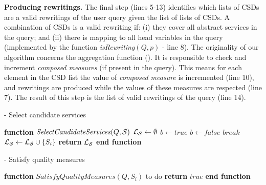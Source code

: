 \noindent \textbf{Producing rewritings.} The final step (lines 5-13) identifies which lists of CSDs are a valid
rewritings of the user query given the list of lists of CSDs.
A combination of CSDs is a valid rewriting if: (i) they cover all abstract services in the query; and 
(ii) there is mapping to all head variables in the query (implemented by the function \textit{isRewriting}$(Q, p)$ - line 8).
The originality of our algorithm concerns the aggregation function ().
It is responsible to check and increment \textit{composed measures} (if present in the query). 
This means for each element in the CSD list the value of \textit{composed measure} is incremented (line 10), and rewritings are produced while the values of these measures are respected (line 7). 
The result of this step is the list of valid 
 rewritings of the query (line 14).%
 
\begin{algorithm}
\caption{ - Select candidate services}
\label{selectingservices}
\begin{algorithmic}[1]
\STATE \textbf{function} $\mathit{SelectCandidateServices} (Q, \hbox{${\cal S}$})$
\STATE $\hbox{${\cal L_{S}}$} \leftarrow \emptyset$
		\STATE $b \leftarrow \mathit{true}$		
				\STATE $b \leftarrow \mathit{false}$	
				\STATE $\mathit{break}$
			\ENDIF
		\ENDFOR
			\STATE $\hbox{${\cal L_{S}}$} \leftarrow \hbox{${\cal L_{S}}$} \cup \lbrace S_{i} \rbrace$	
		\ENDIF
	\ENDIF
\ENDFOR
\STATE \textbf{return} $\hbox{${\cal L_{S}}$}$
\STATE \textbf{end function}
\end{algorithmic}
\end{algorithm}

\begin{algorithm}
\caption{ - Satisfy quality measures}
\label{satisfymeasures}
\begin{algorithmic}[1]
\STATE \textbf{function} $\mathit{SatisfyQualityMeasures (Q, S_{i})}$
\STATE to do
\STATE \textbf{return} $true$
\STATE \textbf{end function}
\end{algorithmic}
\end{algorithm}

